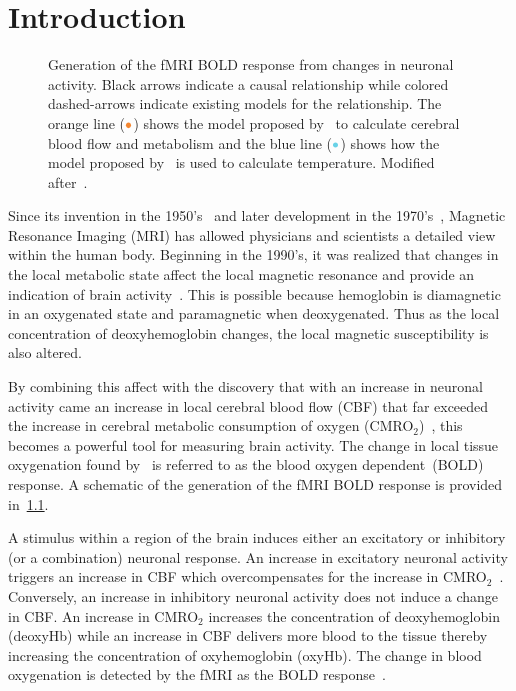\chapter{Introduction}
\label{ch:introduction}
\begin{figure}[tb]
  \centering
  \vspace{10pt}
  
  \caption[Generation of the fMRI BOLD response and a corresponding temperature change]{\label{fig:flowchart} Generation of the fMRI BOLD response from changes in neuronal activity.  Black arrows indicate a causal relationship while colored dashed-arrows indicate existing models for the relationship.  The orange line ($\color{goldfish}\bullet$) shows the model proposed by~\citet{sotero2011} to calculate cerebral blood flow and metabolism and the blue line ($\color{aoi}\bullet$) shows how the model proposed by~\citet{collins} is used to calculate temperature.  Modified after~\citet{sotero2007}.}
\end{figure}

Since its invention in the 1950's~\citep{carr1954} and later development in the 1970's~\citep{lauterbur1973}, {M}agnetic {R}esonance {I}maging ({MRI}) has allowed physicians and scientists a detailed view within the human body.  Beginning in the 1990's, it was realized that changes in the local metabolic state affect the local magnetic resonance and provide an indication of brain activity~\citep{ogawa1990,kwong1992}.  This is possible because hemoglobin is diamagnetic in an oxygenated state and paramagnetic when deoxygenated.  Thus as the local concentration of deoxyhemoglobin changes, the local magnetic susceptibility is also altered.  

By combining this affect with the discovery that with an increase in neuronal activity came an increase in local cerebral blood flow (CBF) that far exceeded the increase in cerebral metabolic consumption of oxygen (CMRO$_2$)~\citet{fox1986}, this becomes a powerful tool for measuring brain activity.  The change in local tissue oxygenation found by~\citet{fox1986} is referred to as the blood oxygen dependent~(BOLD) response.  A schematic of the generation of the fMRI BOLD response is provided in~\cref{fig:flowchart}.

A stimulus within a region of the brain induces either an excitatory or inhibitory (or a combination) neuronal response.  An increase in excitatory neuronal activity triggers an increase in CBF which overcompensates for the increase in CMRO$_2$~\citep{fox1986}.  Conversely, an increase in inhibitory neuronal activity does not induce a change in CBF.  An increase in CMRO$_2$ increases the concentration of deoxyhemoglobin (deoxyHb) while an increase in CBF delivers more blood to the tissue thereby increasing the concentration of oxyhemoglobin (oxyHb).  The change in blood oxygenation is detected by the fMRI as the BOLD response~\citep{kwong1992}.

